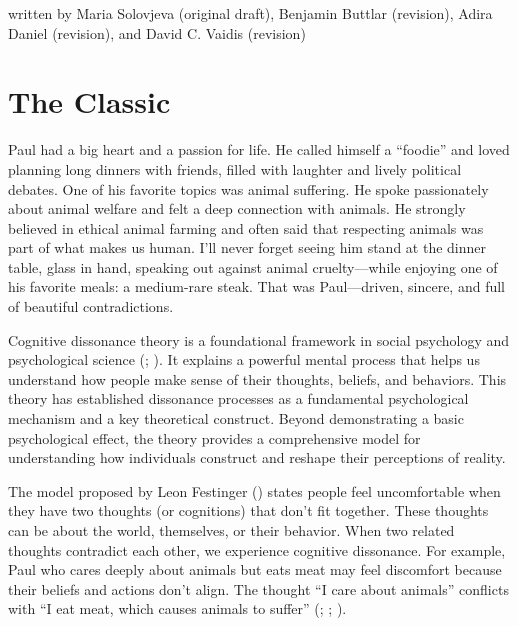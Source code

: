 \documentclass[
  letterpaper,
]{book}
\begin{document}
{written by Maria Solovjeva (original draft), Benjamin Buttlar
(revision), Adira Daniel (revision), and David C. Vaidis (revision)}

\section{The Classic}\label{the-classic-1}

Paul had a big heart and a passion for life. He called himself a
``foodie'' and loved planning long dinners with friends, filled with
laughter and lively political debates. One of his favorite topics was
animal suffering. He spoke passionately about animal welfare and felt a
deep connection with animals. He strongly believed in ethical animal
farming and often said that respecting animals was part of what makes us
human. I'll never forget seeing him stand at the dinner table, glass in
hand, speaking out against animal cruelty---while enjoying one of his
favorite meals: a medium-rare steak. That was Paul---driven, sincere,
and full of beautiful contradictions.

Cognitive dissonance theory is a foundational framework in social
psychology and psychological science
(;
). It explains a
powerful mental process that helps us understand how people make sense
of their thoughts, beliefs, and behaviors. This theory has established
dissonance processes as a fundamental psychological mechanism and a key
theoretical construct. Beyond demonstrating a basic psychological
effect, the theory provides a comprehensive model for understanding how
individuals construct and reshape their perceptions of reality.

The model proposed by Leon Festinger
() states people feel
uncomfortable when they have two thoughts (or cognitions) that don't fit
together. These thoughts can be about the world, themselves, or their
behavior. When two related thoughts contradict each other, we experience
cognitive dissonance. For example, Paul who cares deeply about animals
but eats meat may feel discomfort because their beliefs and actions
don't align. The thought ``I care about animals'' conflicts with ``I eat
meat, which causes animals to suffer''
(;
;
).
\end{document}
